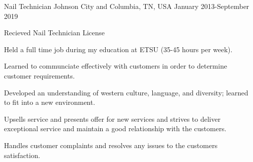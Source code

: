 

\begin{cventries}

  \cventry
    {Nail Technician} %
    {} %
    {Johnson City and Columbia, TN, USA} %
    {January 2013-September 2019} %
    {
      \begin{cvitems} %
      \item Recieved Nail Technician License
      \item Held a full time job during my education at ETSU (35-45 hours per week).
      \item Learned to communciate effectively with customers in order to determine customer requirements.
      \item Developed an understanding of western culture, language, and diversity; learned to fit into a new environment.
      \item Upsells service and presents offer for new services and strives to deliver exceptional service and maintain a good relationship with the customers.
      \item Handles customer complaints and resolves any issues to the customers satisfaction.
      \end{cvitems}
    }


\end{cventries}
